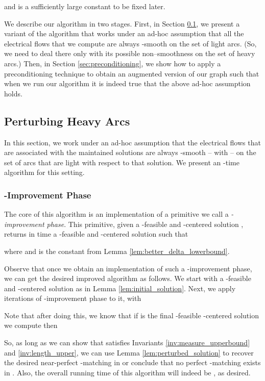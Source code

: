 \documentclass[11pt, letterpaper]{article}
\begin{document}
 and  is a sufficiently large constant to be fixed later. 

We  describe our algorithm in two stages. First, in Section \ref{sec:heavy}, we present a variant of the algorithm that works under an ad-hoc assumption that all the electrical flows  that we compute are always -smooth on the set of light arcs. (So, we need to deal there only with its possible non--smoothness on the set of heavy arcs.) Then, in Section \ref{sec:preconditioning}, we show how to apply a preconditioning technique to obtain an augmented version of our graph such that when we run our algorithm it is indeed true that the above ad-hoc assumption holds. 
 \subsection{Perturbing Heavy Arcs}\label{sec:heavy}


In this section, we work under an ad-hoc assumption that the electrical flows  that are associated with the maintained solutions  are always -smooth -- with  -- on the set of arcs that are light with respect to that solution. We present an -time algorithm for this setting. 

\subsubsection*{-Improvement Phase}

The core of this algorithm is an implementation of a primitive we call a {\em -improvement phase}. This primitive, given a -feasible and -centered solution , returns in  time a -feasible and -centered solution  such that 

where  and  is the constant from Lemma \ref{lem:better_delta_lowerbound}. 

Observe that once we obtain an implementation of such a -improvement phase, we can get the desired improved algorithm as follows. We start with a -feasible and -centered solution  as in Lemma \ref{lem:initial_solution}. Next, we apply  iterations of -improvement phase to it, with


Note that after doing this, we know that if   is the final -feasible -centered solution we compute then
 

So, as long as we can show that  satisfies Invariants \ref{inv:measure_upperbound} and \ref{inv:length_upper}, we can use Lemma \ref{lem:perturbed_solution} to recover the desired near-perfect -matching in  or conclude that no perfect -matching exists in . 
Also, the overall running time of this algorithm will indeed be , as desired. 
\end{document}
